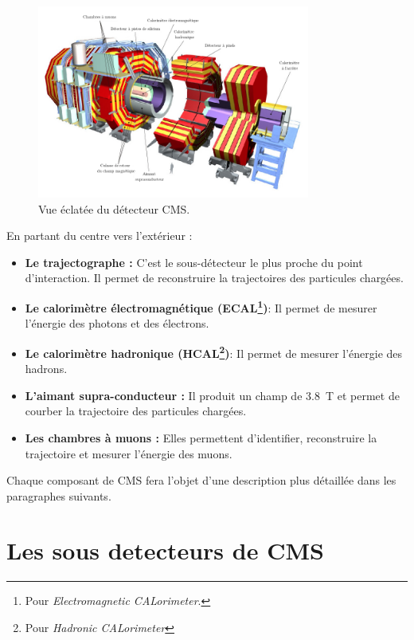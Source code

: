 \begin{figure}
	\centering
	\includegraphics[width=0.80\textwidth]{CMS/cms.png}
	\caption{\label{cmsexploded}Vue éclatée du détecteur CMS.}
\end{figure}
\newpage
En partant du centre vers l'extérieur :
\begin{itemize}[label=$\bullet$]
	\item \textbf{Le trajectographe : } C'est le sous-détecteur le plus proche du point d'interaction. Il permet de reconstruire la trajectoires des particules chargées.
	 \item \textbf{Le calorimètre électromagnétique (ECAL\footnote{Pour \textit{Electromagnetic CALorimeter}.})}: Il permet de mesurer l'énergie des photons et des électrons.
	 \item \textbf{Le calorimètre hadronique (HCAL\footnote{Pour \textit{Hadronic CALorimeter}})}: Il permet de mesurer l'énergie des hadrons.
	 \item \textbf{L'aimant supra-conducteur : } Il produit un champ de \SI{3.8}{\tesla} et permet de courber la trajectoire des particules chargées.
	 \item \textbf{Les chambres à muons : } Elles permettent d'identifier, reconstruire la trajectoire et mesurer l'énergie des muons. 
\end{itemize}
Chaque composant de CMS fera l'objet d'une description plus détaillée dans les paragraphes suivants.

\section{Les sous detecteurs de CMS}
